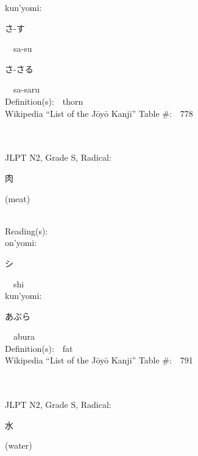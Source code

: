 \begin{multicols}{2}
{\hspace*{1em}}kun'yomi:\ \ \\
{\hspace*{2em}}{\begin{CJK}{UTF8}{min} さ-す \end{CJK}}\ \ sa-su\ \ \\
{\hspace*{2em}}{\begin{CJK}{UTF8}{min} さ-さる \end{CJK}}\ \ sa-saru\ \ \\
Definition(s):\ \ thorn \\
Wikipedia ``List of the J\=oy\=o Kanji'' Table \#:\ \ 778 \\
\ \ \\
{\fontsize{34pt}{40pt}  }\ \ \\  %
{JLPT N2, Grade S, Radical:\ \ {\begin{CJK}{UTF8}{min} 肉 \end{CJK}} (meat) } \\
Reading(s):\ \ \\
{\hspace*{1em}}on'yomi:\ \ \\
{\hspace*{2em}}{\begin{CJK}{UTF8}{min} シ \end{CJK}}\ \ shi\ \ \\
{\hspace*{1em}}kun'yomi:\ \ \\
{\hspace*{2em}}{\begin{CJK}{UTF8}{min} あぶら \end{CJK}}\ \ abura\ \ \\
Definition(s):\ \ fat \\
Wikipedia ``List of the J\=oy\=o Kanji'' Table \#:\ \ 791 \\
\ \ \\
{\fontsize{34pt}{40pt}  }\ \ \\  %
{JLPT N2, Grade S, Radical:\ \ {\begin{CJK}{UTF8}{min} 水 \end{CJK}} (water) } \\

\end{multicols}
